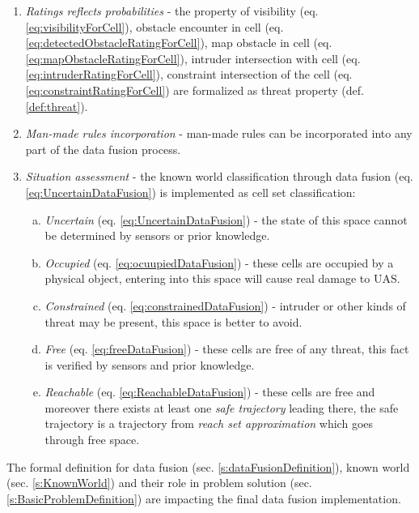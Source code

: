 \begin{enumerate}
        \item \emph{Ratings reflects probabilities} - the property of visibility (eq. \ref{eq:visibilityForCell}), obstacle encounter in cell (eq. \ref{eq:detectedObstacleRatingForCell}), map obstacle in cell (eq. \ref{eq:mapObstacleRatingForCell}), intruder intersection with cell (eq. \ref{eq:intruderRatingForCell}), constraint intersection of the cell (eq. \ref{eq:constraintRatingForCell}) are formalized as threat property (def. \ref{def:threat}). 
	    
	    \item \emph{Man-made rules incorporation} - man-made rules can be incorporated into any part of the data fusion process.
	    
	    \item \emph{Situation assessment} - the known world classification through data fusion (eq. \ref{eq:UncertainDataFusion}) is implemented as cell set classification:
	    \begin{enumerate}[a.]
	        \item \emph{Uncertain} (eq. \ref{eq:UncertainDataFusion}) - the state of this space cannot be determined by sensors or prior knowledge.
	        
	        \item \emph{Occupied} (eq. \ref{eq:ocuupiedDataFusion}) -  these cells are occupied by a physical object, entering into this space will cause real damage to UAS.
	        
 	        \item \emph{Constrained} (eq. \ref{eq:constrainedDataFusion}) - intruder or other kinds of threat may be present, this space is better to avoid.
 	        
	        \item \emph{Free} (eq. \ref{eq:freeDataFusion}) - these cells are free of any threat, this fact is verified by sensors and prior knowledge.
	        
	        \item \emph{Reachable} (eq. \ref{eq:ReachableDataFusion}) - these cells are free and moreover there exists at least one \emph{safe trajectory} leading there, the safe trajectory is a trajectory from \emph{reach set approximation} which goes through free space.
	    \end{enumerate}
\end{enumerate}	    

\begin{note}
    The formal definition for data fusion (sec. \ref{s:dataFusionDefinition}), known world (sec. \ref{s:KnownWorld}) and their role in problem solution (sec. \ref{s:BasicProblemDefinition}) are impacting the final data fusion implementation.
\end{note}
